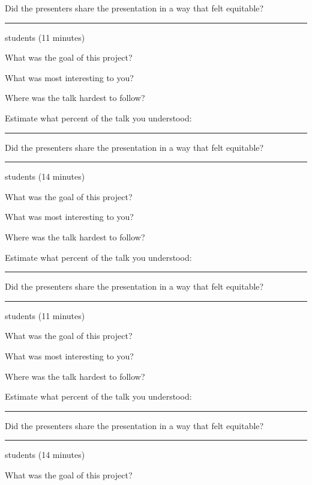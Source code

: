 \documentclass[12pt,letterpaper,noanswers]{exam}
\begin{document}
 \noindent Did the presenters share the presentation in a way that felt equitable?
\vfill
 

   \hrule
  \vspace{0.1cm}

 students (11 minutes)

 \noindent What was the goal of this project?
\vfill
 
 \noindent What was most interesting to you?
\vfill
 
 \noindent Where was the talk hardest to follow?
\vfill
 
 \noindent Estimate what percent of the talk you understood:  \rule{0.5in}{0.5pt}
 
 \noindent Did the presenters share the presentation in a way that felt equitable?
\vfill
 
 \hrule
  \vspace{0.1cm}
 
  students (14 minutes)
 
  \noindent What was the goal of this project?
\vfill
 
 \noindent What was most interesting to you?
\vfill
 
 \noindent Where was the talk hardest to follow?
\vfill
 
 \noindent Estimate what percent of the talk you understood:  \rule{0.5in}{0.5pt}
 
 \noindent Did the presenters share the presentation in a way that felt equitable?
\vfill
 
 \hrule
 \vspace{0.1cm}
 
 \eject
 
  students (11 minutes)
 
  \noindent What was the goal of this project?
\vfill
 
 \noindent What was most interesting to you?
\vfill
 
 \noindent Where was the talk hardest to follow?
\vfill
 
 \noindent Estimate what percent of the talk you understood:  \rule{0.5in}{0.5pt}
 
 \noindent Did the presenters share the presentation in a way that felt equitable?
\vfill
    \hrule
  \vspace{0.1cm}

 students (14 minutes)

 \noindent What was the goal of this project?
\vfill
 
\end{document}
